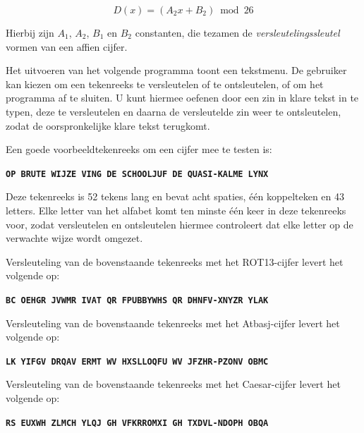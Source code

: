 \[
 D(x) = (A_{2}x + B_{2}) \bmod 26
\]

Hierbij zijn $A_{1}$, $A_{2}$, $B_{1}$ en $B_{2}$ constanten, die tezamen de {\it versleutelingssleutel} vormen van een affien cijfer.

Het uitvoeren van het volgende programma toont een tekstmenu. De gebruiker kan kiezen om een tekenreeks te versleutelen of te ontsleutelen, of om het programma af te sluiten. U kunt hiermee oefenen door een zin in klare tekst in te typen, deze te versleutelen en daarna de versleutelde zin weer te ontsleutelen, zodat de oorspronkelijke klare tekst terugkomt.

Een goede voorbeeldtekenreeks om een cijfer mee te testen is:

\texttt{\bf OP BRUTE WIJZE VING DE SCHOOLJUF DE QUASI-KALME LYNX}

Deze tekenreeks is 52 tekens lang en bevat acht spaties, één koppelteken en 43 letters. Elke letter van het alfabet komt ten minste één keer in deze tekenreeks voor, zodat versleutelen en ontsleutelen hiermee controleert dat elke letter op de verwachte wijze wordt omgezet.

Versleuteling van de bovenstaande tekenreeks met het ROT13-cijfer levert het volgende op:

\texttt{\bf BC OEHGR JVWMR IVAT QR FPUBBYWHS QR DHNFV-XNYZR YLAK}

Versleuteling van de bovenstaande tekenreeks met het Atbasj-cijfer levert het volgende op:

\texttt{\bf LK YIFGV DRQAV ERMT WV HXSLLOQFU WV JFZHR-PZONV OBMC}

Versleuteling van de bovenstaande tekenreeks met het Caesar-cijfer levert het volgende op:

\texttt{\bf RS EUXWH ZLMCH YLQJ GH VFKRROMXI GH TXDVL-NDOPH OBQA}

